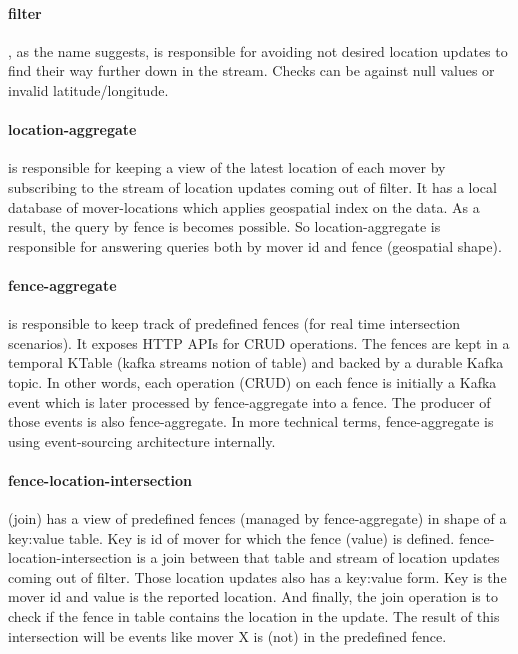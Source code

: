 \documentclass[a4]{report}
\begin{document}
    \paragraph{filter}, as the name suggests, is responsible  for avoiding not desired location updates to find their
    way further down in the stream.
    Checks can be against null values or invalid latitude/longitude.

    \paragraph{location-aggregate} is responsible for keeping a view of the latest location of each mover by
    subscribing to the stream of location updates coming out of filter.
    It has a local database of mover-locations which applies geospatial index on the data.
    As a result, the query by fence is becomes possible.
    So location-aggregate is responsible for answering queries both by mover id and fence (geospatial shape).

    \paragraph{fence-aggregate} is responsible to keep track of predefined fences (for real time intersection scenarios).
    It exposes HTTP APIs for CRUD operations.
    The fences are kept in a temporal KTable (kafka streams notion of table) and backed by a durable Kafka topic.
    In other words, each operation (CRUD) on each fence is initially a Kafka event which is later processed by
    fence-aggregate into a fence.
    The producer of those events is also fence-aggregate.
    In more technical terms, fence-aggregate is using event-sourcing architecture internally.

    \paragraph{fence-location-intersection} (join) has a view of predefined fences (managed by fence-aggregate) in
    shape of a key:value table.
    Key is id of mover for which the fence (value) is defined.
    fence-location-intersection is a join between that table and stream of location updates coming out of filter.
    Those location updates also has a key:value form.
    Key is the mover id and value is the reported location.
    And finally, the join operation is to check if the fence in table contains the location in the update.
    The result of this intersection will be events like mover X is (not) in the predefined fence.
\end{document}
